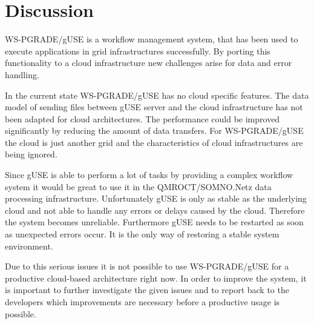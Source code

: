 \section{Discussion}\label{discussion}

WS-PGRADE/gUSE is a workflow management system, that has been used to execute applications in grid infrastructures successfully.
By porting this functionality to a cloud infrastructure new challenges arise for data and error handling.

In the current state WS-PGRADE/gUSE has no cloud specific features.
The data model of sending files between gUSE server and the cloud infrastructure has not been adapted for cloud architectures.
The performance could be improved significantly by reducing the amount of data transfers.
For WS-PGRADE/gUSE the cloud is just another grid and the characteristics of cloud infrastructures are being ignored.

Since gUSE is able to perform a lot of tasks by providing a complex workflow system it would be great to use it in the QMROCT/SOMNO.Netz data processing infrastructure.
Unfortunately gUSE is only as stable as the underlying cloud and not able to handle any errors or delays caused by the cloud.
Therefore the system becomes unreliable.
Furthermore gUSE needs to be restarted as soon as unexpected errors occur.
It is the only way of restoring a stable system environment.

Due to this serious issues it is not possible to use WS-PGRADE/gUSE for a productive cloud-based architecture right now.
In order to improve the system, it is important to further investigate the given issues and to report back to the developers which improvements are necessary before a productive usage is possible.
